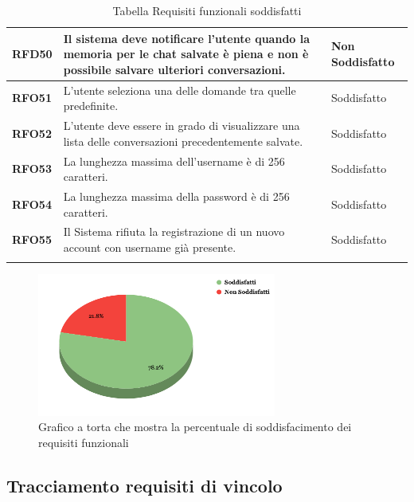 \begin{longtable}{|>{\centering\arraybackslash}m{}|>{\centering\arraybackslash}m{}|>{\centering\arraybackslash}m{}|}
    \hline
    \textbf{RFD50} & Il sistema deve notificare l'utente quando la memoria per le chat salvate è piena e non è possibile salvare ulteriori conversazioni. & Non Soddisfatto \\
    \hline
    \textbf{RFO51} & L'utente seleziona una delle domande tra quelle predefinite. & Soddisfatto \\
    \hline
    \textbf{RFO52} & L'utente deve essere in grado di visualizzare una lista delle conversazioni precedentemente salvate. & Soddisfatto \\
    \hline
    \textbf{RFO53} & La lunghezza massima dell'username è di 256 caratteri. & Soddisfatto \\
    \hline
    \textbf{RFO54} & La lunghezza massima della password è di 256 caratteri. & Soddisfatto \\
    \hline
    \textbf{RFO55} & Il Sistema rifiuta la registrazione di un nuovo account con username già presente. & Soddisfatto \\
    \hline

\caption{Tabella Requisiti funzionali soddisfatti}
\end{longtable}

\begin{figure}[H]
    \centering
    \includegraphics[width=0.7\textwidth]{img/RequisitiFunzionali.png}
    \caption{Grafico a torta che mostra la percentuale di soddisfacimento dei requisiti funzionali}
\end{figure}
\newpage
\subsection{Tracciamento requisiti di vincolo}

